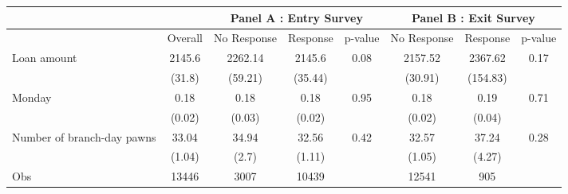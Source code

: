 \begin{tabular}{lcccc|ccc}
\toprule
      &       & \multicolumn{3}{c|}{Panel A : Entry Survey} & \multicolumn{3}{c}{Panel B : Exit Survey} \\
\midrule
\midrule
      & Overall & No Response & Response & p-value & No Response & Response & p-value \\
\midrule
\midrule
Loan amount  & 2145.6 & 2262.14 & 2145.6 & 0.08  & 2157.52 & 2367.62 & 0.17 \\
      & (31.8) & (59.21) & (35.44) &       & (30.91) & (154.83) &  \\
Monday & 0.18  & 0.18  & 0.18  & 0.95  & 0.18  & 0.19  & 0.71 \\
      & (0.02) & (0.03) & (0.02) &       & (0.02) & (0.04) &  \\
Number of branch-day pawns & 33.04 & 34.94 & 32.56 & 0.42  & 32.57 & 37.24 & 0.28 \\
      & (1.04) & (2.7) & (1.11) &       & (1.05) & (4.27) &  \\
\midrule
Obs   & 13446 & 3007  & 10439 &       & 12541 & 905   &  \\
\bottomrule
\bottomrule
\end{tabular}%
